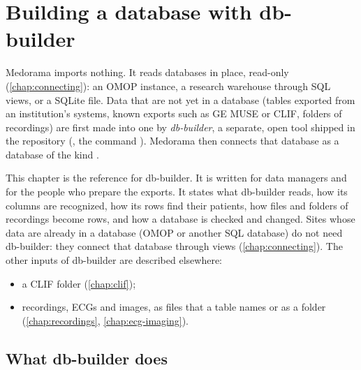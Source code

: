 \chapter{Building a database with db-builder}
\label{chap:importing}

Medorama imports nothing. It reads databases in place, read-only (\cref{chap:connecting}): an
OMOP instance, a research warehouse through SQL views, or a SQLite file. Data that are not yet in
a database (tables exported from an institution's systems, known exports such as GE MUSE or
CLIF, folders of recordings) are first made into one by \emph{db-builder}, a separate, open tool
shipped in the repository (, the command ). Medorama then
connects that database as a database of the kind .

This chapter is the reference for db-builder. It is written for data managers and for the people
who prepare the exports. It states what db-builder reads, how its columns are recognized, how its
rows find their patients, how files and folders of recordings become rows, and how a database is
checked and changed. Sites whose data are already in a database (OMOP or another SQL database)
do not need db-builder: they connect that database through views
(\cref{chap:connecting}). The other inputs of db-builder are described elsewhere:
\begin{itemize}
\item a CLIF folder (\cref{chap:clif});
\item recordings, ECGs and images, as files that a table names or as a folder
  (\cref{chap:recordings}, \cref{chap:ecg-imaging}).
\end{itemize}

\section{What db-builder does}
\label{sec:importing-rule}

